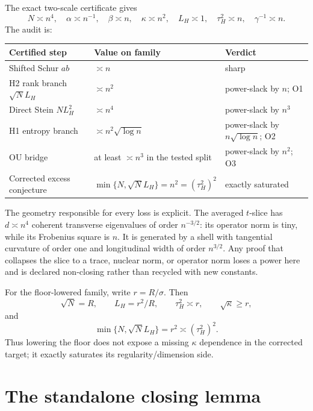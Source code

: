 \documentclass[11pt]{article}
\numberwithin{equation}{section}
\begin{document}
The exact two-scale certificate gives
\begin{equation}\label{eq:mandatory-scales}
 N\asymp n^4,\quad \alpha\asymp n^{-1},\quad \beta\asymp n,\quad
 \kappa\asymp n^2,\quad L_H\asymp1,\quad
 \tau_H^2\asymp n,\quad \gamma^{-1}\asymp n.
\end{equation}
The audit is:
\begin{center}
\begin{tabular}{@{}
  >{\raggedright\arraybackslash}p{}
  >{\raggedright\arraybackslash}p{}
  >{\raggedright\arraybackslash}p{}@{}}
\toprule
Certified step & Value on family & Verdict\\
\midrule
Shifted Schur $ab$ & $\asymp n$ & sharp\\
H2 rank branch $\sqrt N L_H$ & $\asymp n^2$ & power-slack by $n$; O1\\
Direct Stein $NL_H^2$ & $\asymp n^4$ & power-slack by $n^3$\\
H1 entropy branch & $\asymp n^2\sqrt{\log n}$ & power-slack by
$n\sqrt{\log n}$; O2\\
OU bridge & at least $\asymp n^3$ in the tested split & power-slack by
$n^2$; O3\\
Corrected excess conjecture &
$\min\{N,\sqrt N L_H\}=n^2=(\tau_H^2)^2$ & exactly saturated\\
\bottomrule
\end{tabular}
\end{center}
The geometry responsible for every loss is explicit.  The averaged
$t$-slice has $d\asymp n^4$ coherent transverse eigenvalues of order
$n^{-3/2}$: its operator norm is tiny, while its Frobenius square is
$n$.  It is generated by a shell with tangential curvature of order one and
longitudinal width of order $n^{3/2}$.  Any proof that collapses the slice to
a trace, nuclear norm, or operator norm loses a power here and is declared
non-closing rather than recycled with new constants.

For the floor-lowered family, write $r=R/\sigma$.  Then
\[
 \sqrt N=R,\qquad L_H=r^2/R,\qquad
 \tau_H^2\asymp r,\qquad \sqrt\kappa\ge r,
\]
and
\begin{equation}\label{eq:floor-open-audit}
 \min\{N,\sqrt N L_H\}=r^2\asymp(\tau_H^2)^2.
\end{equation}
Thus lowering the floor does not expose a missing $\kappa$ dependence in the
corrected target; it exactly saturates its regularity/dimension side.

\section{The standalone closing lemma}\label{sec:open-lemma}
\end{document}
